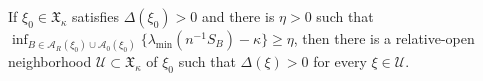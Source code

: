 If \(\xi_0\in\mathfrak X_\kappa\) satisfies \(\Delta(\xi_0)>0\) and there is \(\eta>0\) such that \(\inf_{B\in\mathcal A_R(\xi_0)\cup\mathcal A_0(\xi_0)}\{\lambda_{\min}(n^{-1}S_B)-\kappa\}\ge\eta\), then there is a relative-open neighborhood \(\mathcal U\subset\mathfrak X_\kappa\) of \(\xi_0\) such that \(\Delta(\xi)>0\) for every \(\xi\in\mathcal U\).